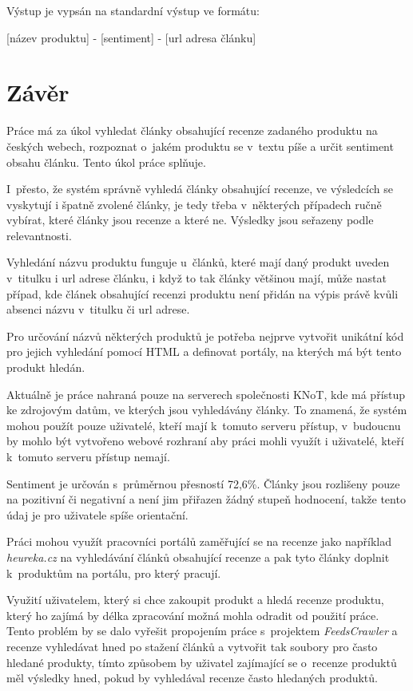Výstup je vypsán na standardní výstup ve formátu: 

[název produktu] - [sentiment] - [url adresa článku]


\chapter{Závěr}
\label{zaver}

Práce má za úkol vyhledat články obsahující recenze zadaného produktu na českých webech, rozpoznat o~jakém produktu se v~textu píše a určit sentiment obsahu článku. Tento úkol práce splňuje.

I~přesto, že systém správně vyhledá články obsahující recenze, ve výsledcích se vyskytují i špatně zvolené články, je tedy třeba v~některých případech ručně vybírat, které články jsou recenze a které ne. Výsledky jsou seřazeny podle relevantnosti.

Vyhledání názvu produktu funguje u~článků, které mají daný produkt uveden v~titulku i url adrese článku, i když to tak články většinou mají, může nastat případ, kde článek obsahující recenzi produktu není přidán na výpis právě kvůli absenci názvu v~titulku či url adrese.

Pro určování názvů některých produktů je potřeba nejprve vytvořit unikátní kód pro jejich vyhledání pomocí HTML a definovat portály, na kterých má být tento produkt hledán.

Aktuálně je práce nahraná pouze na serverech společnosti KNoT, kde má přístup ke zdrojovým datům, ve kterých jsou vyhledávány články. To znamená, že systém mohou použít pouze uživatelé, kteří mají k~tomuto serveru přístup, v~budoucnu by mohlo být vytvořeno webové rozhraní aby práci mohli využít i uživatelé, kteří k~tomuto serveru přístup nemají.

Sentiment je určován s~průměrnou přesností 72,6\%. Články jsou rozlišeny pouze na pozitivní či negativní a není jim přiřazen žádný stupeň hodnocení, takže tento údaj je pro uživatele spíše orientační.

Práci mohou využít pracovníci portálů zaměřující se na recenze jako například \textit{heureka.cz} na vyhledávání článků obsahující recenze a pak tyto články doplnit k~produktům na portálu, pro který pracují. 

Využití uživatelem, který si chce zakoupit produkt a hledá recenze produktu, který ho zajímá by délka zpracování možná mohla odradit od použití práce. Tento problém by se dalo vyřešit propojením práce s~projektem \textit{FeedsCrawler} a recenze vyhledávat hned po stažení článků a vytvořit tak soubory pro často hledané produkty, tímto způsobem by uživatel zajímající se o~recenze produktů měl výsledky hned, pokud by vyhledával recenze často hledaných produktů. 
